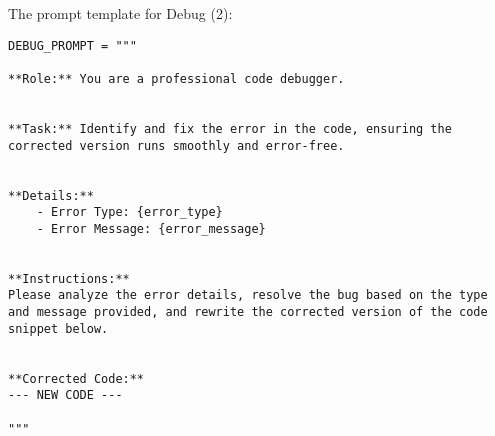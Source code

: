 The prompt template for Debug (2):
\begin{lstlisting}
DEBUG_PROMPT = """

**Role:** You are a professional code debugger.


**Task:** Identify and fix the error in the code, ensuring the corrected version runs smoothly and error-free.


**Details:**
    - Error Type: {error_type}
    - Error Message: {error_message}


**Instructions:**
Please analyze the error details, resolve the bug based on the type and message provided, and rewrite the corrected version of the code snippet below.


**Corrected Code:**
--- NEW CODE ---

"""
\end{lstlisting}

